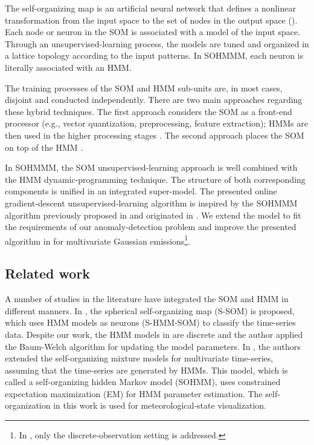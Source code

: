 The self-organizing map is an artificial neural network that defines a nonlinear transformation from the input space to the set of nodes in the output space (\cite{Somervuo2000}). Each node or neuron in the SOM is associated with a model of the input space. Through an unsupervised-learning process, the models are tuned and organized in a lattice topology according to the input patterns. In SOHMMM, each neuron is literally associated with an HMM.  

The training processes of the SOM and HMM sub-units are, in most cases, disjoint and conducted independently. There are two main approaches regarding these hybrid techniques. The first approach considers the SOM as a front-end processor (e.g., vector quantization, preprocessing, feature extraction); HMMs are then used in the higher processing stages \cite{Somervuo2000,Kurimo1996,Morimoto2016}. The second approach places the SOM on top of the HMM \cite{Ferles2013,Ferles2013b,Lebbah2015}.   

In SOHMMM, the SOM unsupervised-learning approach is well combined with the HMM dynamic-programming technique. The structure of both corresponding components is unified in an integrated super-model. The presented online gradient-descent unsupervised-learning algorithm is inspired by the SOHMMM algorithm previously proposed in \cite{Ferles2013} and originated in \cite{Baldi1994}. We extend the model to fit the requirements of our anomaly-detection problem and improve the presented algorithm in \cite{Ferles2013} for multivariate Gaussian emissions\footnote{In \cite{Ferles2013}, only the discrete-observation setting is addressed.}.

\subsection{Related work}
A number of studies in the literature have integrated the SOM and HMM in different manners. In \citet{Gen2012}, the spherical self-organizing map (S-SOM) is proposed, which uses HMM models as neurons (S-HMM-SOM) to classify the time-series data. Despite our work, the HMM models in \citet{Gen2012} are discrete and the author applied the  Baum-Welch algorithm for updating the model parameters. In \citet{Yamaguchi2010}, the authors extended the self-organizing mixture models for multivariate time-series, assuming that the time-series are generated by HMMs. This model, which is called a self-organizing hidden Markov model (SOHMM), uses constrained expectation maximization (EM) for HMM parameter estimation. The self-organization in this work is used for meteorological-state visualization. 

